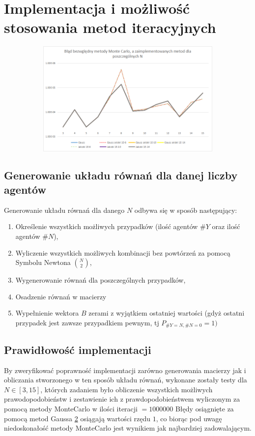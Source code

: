 \documentclass[10pt]{article}
\begin{document}
\section{Implementacja i możliwość stosowania metod iteracyjnych}
\begin{figure}[h]
	\caption{Wykres reprezentujący błąd bezwzględny metod Gaussa oraz metod iteracyjnych względem metody MonteCarlo\label{rys}}
	\begin{subfigure}{1\textwidth}
		\includegraphics[width=\textwidth]{1.png}
		\caption{ \label{Rys1a}}
	\end{subfigure}
\end{figure}
\subsection{Generowanie układu równań dla danej liczby agentów}
Generowanie układu równań dla danego $N$ odbywa się w sposób następujący:
\begin{enumerate}
	\item Określenie wszystkich możliwych przypadków (ilość agentów $\#Y$ oraz ilość agentów $\#N$),
	\item Wyliczenie wszystkich możliwych kombinacji bez powtórzeń za pomocą Symbolu Newtona ${{N} \choose {2}}$,
	\item Wygenerowanie równań dla poszczególnych przypadków,
	\item Osadzenie równań w macierzy
	\item Wypełnienie wektora $B$ zerami z wyjątkiem ostatniej wartości (gdyż ostatni przypadek jest zawsze przypadkiem pewnym, tj $P_{\#Y=N,\#N=0}=1)$
\end{enumerate}
\subsection{Prawidłowość implementacji}
By zweryfikować poprawność implementacji zarówno generowania macierzy jak i obliczania stworzonego w ten sposób układu równań, wykonane zostały testy dla $N \in [3,15]$, których zadaniem było obliczenie wszystkich możliwych prawodopodobieństw i zestawienie ich z prawdopodobieństwem wyliczonym za pomocą metody MonteCarlo w ilości iteracji $=1000000$
Błędy osiągnięte za pomocą metod Gaussa \ref{Rys1a} osiągają wartości rzędu $1$, co biorąc pod uwagę niedoskonałość metody MonteCarlo jest wynikiem jak najbardziej zadowalającym.
\end{document}
